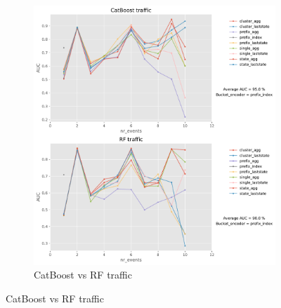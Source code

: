 \documentclass[twoside,11pt]{Latex/Classes/PhDthesisPSnPDF}
\begin{document}
\begin{figure}[t!]
\begin{subfigure}{0.48\textwidth}
		\includegraphics[width=\linewidth]{images/catboost/graphsrf/traffic_CatBoost_rf.pdf}
		\caption{CatBoost vs RF traffic} \label{fig:trafcr}
	\end{subfigure}
	

\end{figure}
\end{document}
